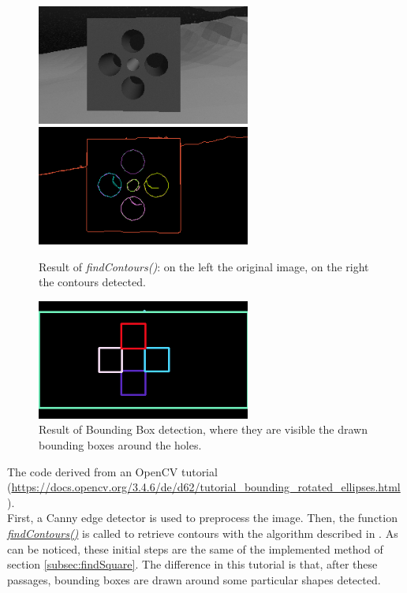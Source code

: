 \begin{figure}[H]
	\centering
	\centerline{
	\includegraphics[width=7.0cm]{BoundBox_sourceOnlyPolig}
	\qquad
	\includegraphics[width=7.0cm]{BoundBox_resultOnlyPolig}
	}
	\caption[Result of \emph{findContours()}]{Result of \emph{findContours()}: on the left the original image, on the right the contours detected.}
	\label{fig:BoundBoxresultOnlyPolig}
\end{figure}

\begin{figure}[H]
	\centering
	\includegraphics[width=7.0cm]{BoundBox_resultOnlyRect}
	\caption[Result of Bounding Box detection]{Result of Bounding Box detection, where they are visible the drawn bounding boxes around the holes.}
	\label{fig:BoundBoxresultOnlyRect}
\end{figure}

The code derived from an OpenCV tutorial (\url{https://docs.opencv.org/3.4.6/de/d62/tutorial_bounding_rotated_ellipses.html}).\\
First, a Canny edge detector is used to preprocess the image. Then, the function \href{https://docs.opencv.org/3.4.6/d3/dc0/group__imgproc__shape.html#ga17ed9f5d79ae97bd4c7cf18403e1689a}{\textit{findContours()}} is called to retrieve contours with the algorithm described in \cite{findcountors}. As can be noticed, these initial steps are the same of the implemented method of section \ref{subsec:findSquare}. The difference in this tutorial is that, after these passages, bounding boxes are drawn around some particular shapes detected.\\

